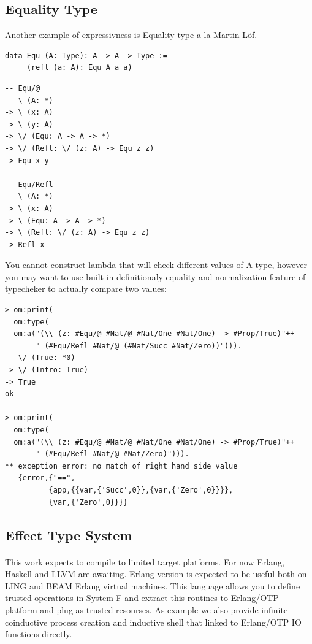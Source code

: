 \documentclass[11pt,oneside]{article}
\begin{document}
\newpage
\subsection{Equality Type}

Another example of expressivness is Equality type a la Martin-Löf.

\begin{lstlisting}[mathescape=true]
data Equ (A: Type): A -> A -> Type :=
     (refl (a: A): Equ A a a)
\end{lstlisting}

\begin{lstlisting}[mathescape=true]
-- Equ/@
   \ (A: *)
-> \ (x: A)
-> \ (y: A)
-> \/ (Equ: A -> A -> *)
-> \/ (Refl: \/ (z: A) -> Equ z z)
-> Equ x y

-- Equ/Refl
   \ (A: *)
-> \ (x: A)
-> \ (Equ: A -> A -> *)
-> \ (Refl: \/ (z: A) -> Equ z z)
-> Refl x
\end{lstlisting}

You cannot construct lambda that will check different values of A type,
however you may want to use built-in definitionaly equality and
normalization feature of typecheker to actually compare two values:

\begin{lstlisting}[mathescape=true]
> om:print(
  om:type(
  om:a("(\\ (z: #Equ/@ #Nat/@ #Nat/One #Nat/One) -> #Prop/True)"++
       " (#Equ/Refl #Nat/@ (#Nat/Succ #Nat/Zero))"))).
   \/ (True: *0)
-> \/ (Intro: True)
-> True
ok

> om:print(
  om:type(
  om:a("(\\ (z: #Equ/@ #Nat/@ #Nat/One #Nat/One) -> #Prop/True)"++
       " (#Equ/Refl #Nat/@ #Nat/Zero)"))).
** exception error: no match of right hand side value
   {error,{"==",
          {app,{{var,{'Succ',0}},{var,{'Zero',0}}}},
          {var,{'Zero',0}}}}
\end{lstlisting}

\newpage
\subsection{Effect Type System}

\paragraph{}
This work expects to compile to limited target platforms. For now Erlang, Haskell and LLVM are awaiting.
Erlang version is expected to be useful both on LING and BEAM Erlang virtual machines. This language
allows you to define trusted operations in System F and extract this routines to Erlang/OTP platform
and plug as trusted resourses. As example we also provide infinite coinductive process creation
and inductive shell that linked to Erlang/OTP IO functions directly.
\end{document}
